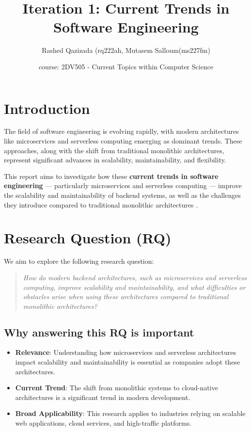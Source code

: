 \documentclass[a4paper, 12pt]{article}
\title{Iteration 1: Current Trends in Software Engineering}
\author{Rashed Qazizada (rq222ah,  Mutasem Salloum(ms227fm)}
\date{course: 2DV505 - Current Topics within Computer Science}
\begin{document}
\maketitle

\section{Introduction}
The field of software engineering is evolving rapidly, with modern architectures like microservices and serverless computing emerging as dominant trends. These approaches, along with the shift from traditional monolithic architectures, represent significant advances in scalability, maintainability, and flexibility. 

This report aims to investigate how these \textbf{current trends in software engineering} — particularly microservices and serverless computing — improve the scalability and maintainability of backend systems, as well as the challenges they introduce compared to traditional monolithic architectures \cite{DATTA2024104762, UNLU2024107334, GIMENOSARROCA2024104764}.

\section{Research Question (RQ)}

We aim to explore the following research question: 
\begin{quote}
\textit{How do modern backend architectures, such as microservices and serverless computing, improve scalability and maintainability, and what difficulties or obstacles arise when using these architectures compared to traditional monolithic architectures?}
\end{quote}


\subsection{Why answering this RQ is important}
\begin{itemize}
    \item \textbf{Relevance}: Understanding how microservices and serverless architectures impact scalability and maintainability is essential as companies adopt these architectures.
    \item \textbf{Current Trend}: The shift from monolithic systems to cloud-native architectures is a significant trend in modern development.
    \item \textbf{Broad Applicability}: This research applies to industries relying on scalable web applications, cloud services, and high-traffic platforms.
\end{itemize}
\end{document}
